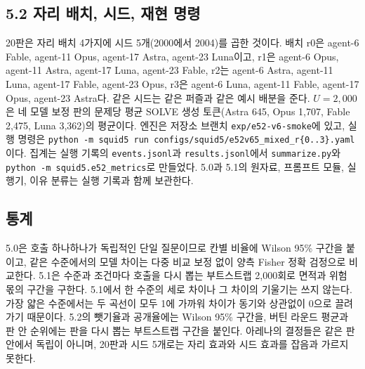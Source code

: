 \subsection{5.2 자리 배치, 시드, 재현 명령}\label{app:arena-repro}
20판은 자리 배치 4가지에 시드 5개(2000에서 2004)를 곱한 것이다. 배치 r0은 agent-6 Fable, agent-11 Opus, agent-17 Astra, agent-23 Luna이고, r1은 agent-6 Opus, agent-11 Astra, agent-17 Luna, agent-23 Fable, r2는 agent-6 Astra, agent-11 Luna, agent-17 Fable, agent-23 Opus, r3은 agent-6 Luna, agent-11 Fable, agent-17 Opus, agent-23 Astra다. 같은 시드는 같은 퍼즐과 같은 예시 배분을 준다. $U=2{,}000$은 네 모델 보정 판의 문제당 평균 SOLVE 생성 토큰(Astra 645, Opus 1,707, Fable 2,475, Luna 3,362)의 평균이다. 엔진은 저장소 브랜치 \texttt{exp/e52-v6-smoke}에 있고, 실행 명령은 \texttt{python -m squid5 run configs/squid5/e52v65\_mixed\_r\{0..3\}.yaml}이다. 집계는 실행 기록의 \texttt{events.jsonl}과 \texttt{results.jsonl}에서 \texttt{summarize.py}와 \texttt{python -m squid5.e52\_metrics}로 만들었다. 5.0과 5.1의 원자료, 프롬프트 모듈, 실행기, 이유 분류는 실행 기록과 함께 보관한다.

\subsection{통계}\label{app:stats}
5.0은 호출 하나하나가 독립적인 단일 질문이므로 칸별 비율에 Wilson 95\% 구간을 붙이고, 같은 수준에서의 모델 차이는 다중 비교 보정 없이 양측 Fisher 정확 검정으로 비교한다. 5.1은 수준과 조건마다 호출을 다시 뽑는 부트스트랩 2,000회로 면적과 위험 몫의 구간을 구한다. 5.1에서 한 수준의 세로 차이나 그 차이의 기울기는 쓰지 않는다. 가장 얇은 수준에서는 두 곡선이 모두 1에 가까워 차이가 동기와 상관없이 0으로 끌려가기 때문이다. 5.2의 뺏기율과 공개율에는 Wilson 95\% 구간을, 버틴 라운드 평균과 판 안 순위에는 판을 다시 뽑는 부트스트랩 구간을 붙인다. 아레나의 결정들은 같은 판 안에서 독립이 아니며, 20판과 시드 5개로는 자리 효과와 시드 효과를 잡음과 가르지 못한다.

